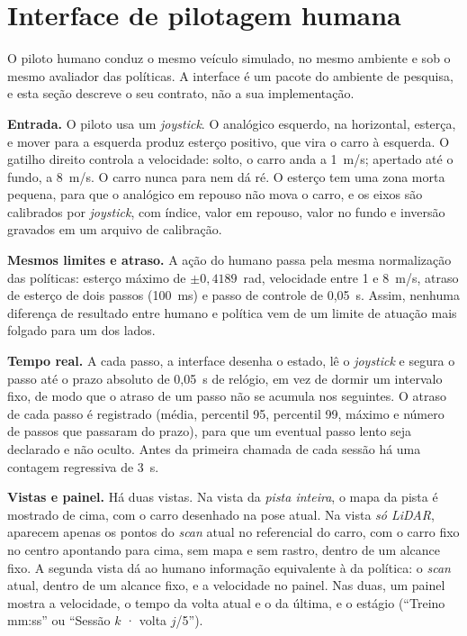 \section{Interface de pilotagem humana}\label{sec:prop-humano}

O piloto humano conduz o mesmo veículo simulado, no mesmo ambiente e sob o mesmo
avaliador das políticas. A interface é um pacote do ambiente de pesquisa, e esta
seção descreve o seu contrato, não a sua implementação.

\textbf{Entrada.} O piloto usa um \textit{joystick}. O analógico esquerdo, na
horizontal, esterça, e mover para a esquerda produz esterço positivo, que vira o
carro à esquerda. O gatilho direito controla a velocidade: solto, o carro anda a
1~m/s; apertado até o fundo, a 8~m/s. O carro nunca para nem dá ré. O esterço tem
uma zona morta pequena, para que o analógico em repouso não mova o carro, e os
eixos são calibrados por \textit{joystick}, com índice, valor em repouso, valor
no fundo e inversão gravados em um arquivo de calibração.

\textbf{Mesmos limites e atraso.} A ação do humano passa pela mesma normalização
das políticas: esterço máximo de $\pm 0{,}4189$~rad, velocidade entre 1 e 8~m/s,
atraso de esterço de dois passos (100~ms) e passo de controle de 0,05~s. Assim,
nenhuma diferença de resultado entre humano e política vem de um limite de
atuação mais folgado para um dos lados.

\textbf{Tempo real.} A cada passo, a interface desenha o estado, lê o
\textit{joystick} e segura o passo até o prazo absoluto de 0,05~s de relógio,
em vez de dormir um intervalo fixo, de modo que o atraso de um passo não se
acumula nos seguintes. O atraso de cada passo é registrado (média, percentil 95,
percentil 99, máximo e número de passos que passaram do prazo), para que
um eventual passo lento seja declarado e não oculto. Antes da primeira chamada de
cada sessão há uma contagem regressiva de 3~s.

\textbf{Vistas e painel.} Há duas vistas. Na vista da \textit{pista inteira}, o
mapa da pista é mostrado de cima, com o carro desenhado na pose atual. Na vista
\textit{só LiDAR}, aparecem apenas os pontos do \textit{scan} atual no referencial
do carro, com o carro fixo no centro apontando para cima, sem mapa e sem rastro,
dentro de um alcance fixo. A segunda vista dá ao humano informação equivalente à
da política: o \textit{scan} atual, dentro de um alcance fixo, e a velocidade no
painel. Nas duas, um painel mostra a velocidade, o tempo da volta atual e
o da última, e o estágio (``Treino mm:ss'' ou ``Sessão $k$ · volta $j$/5'').


